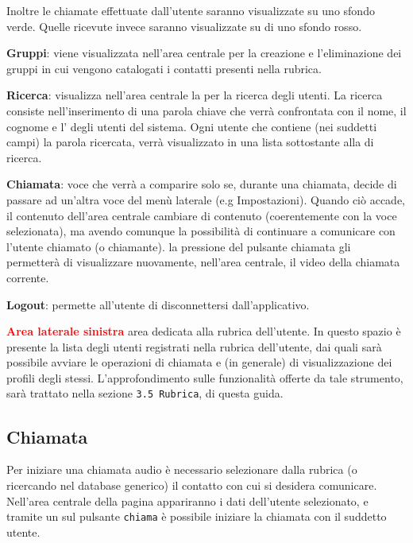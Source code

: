 \begin{description}
\begin{description}
\begin{itemize}
	\end{itemize}
	Inoltre le chiamate effettuate dall'utente saranno visualizzate su uno sfondo verde. Quelle ricevute invece saranno visualizzate su di uno sfondo rosso.
\item \textbf{Gruppi}: viene visualizzata nell'area centrale  per la creazione e l'eliminazione dei gruppi in cui vengono catalogati i contatti presenti nella rubrica.
\item \textbf{Ricerca}: visualizza nell'area centrale la  per la ricerca degli utenti. La ricerca consiste nell'inserimento di una parola chiave che verrà confrontata con il nome, il cognome e l' degli utenti del sistema. Ogni utente che contiene (nei suddetti campi) la parola ricercata, verrà visualizzato in una lista sottostante alla  di ricerca.
\item \textbf{Chiamata}: voce che verrà a comparire solo se, durante una chiamata, decide di passare ad un'altra voce del menù laterale (e.g Impostazioni). Quando ciò accade, il contenuto dell'area centrale cambiare di contenuto (coerentemente con la voce selezionata), ma avendo comunque la possibilità di continuare a comunicare con l'utente chiamato (o chiamante). la pressione del pulsante chiamata gli permetterà di visualizzare nuovamente, nell'area centrale, il video della chiamata corrente.
\item \textbf{Logout}: permette all'utente di disconnettersi dall'applicativo.
\end{description}
\item \textcolor{red}{\textbf{Area laterale sinistra}} area dedicata alla rubrica dell'utente. In questo spazio è presente la lista degli utenti registrati nella rubrica dell'utente, dai quali sarà possibile avviare le operazioni di chiamata e (in generale) di visualizzazione dei profili degli stessi. L'approfondimento sulle funzionalità offerte da tale strumento, sarà trattato nella sezione \texttt{3.5 Rubrica}, di questa guida.
\end{description}

\clearpage

\subsection{Chiamata}
Per iniziare una chiamata audio è necessario selezionare dalla rubrica (o ricercando nel database generico) il contatto con cui si desidera comunicare. Nell'area centrale della pagina appariranno i dati dell'utente selezionato, e tramite un  sul pulsante \texttt{chiama} è possibile iniziare la chiamata con il suddetto utente.

